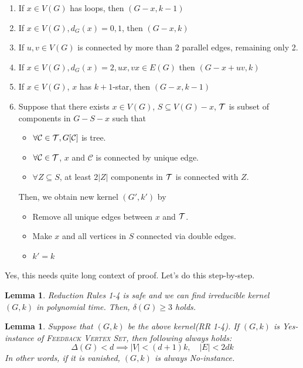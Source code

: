 \documentclass[12pt, a4paper, openany, twoside]{book}
\newtheorem{lem}[thm]{Lemma}
\theoremstyle{definition}
\theoremstyle{remark}
\newcommand{\CC}{{\mathcal {C}}} \newcommand{\CD}{{\mathcal {D}}}
\theoremstyle{plain}
\numberwithin{equation}{section}
\begin{document}
\begin{tcolorbox}[colback=yellow!10!white,colframe=blue!75!white,title=Reduction Rules for FVS kernelization,breakable]

\begin{enumerate}
    \item If $x \in V(G)$ has loops, then $(G - x, k - 1)$
    \item If $x \in V(G), d_G(x) = 0, 1$, then $(G - x, k)$
    \item If $u, v \in V(G)$ is connected by more than 2 parallel edges, remaining only 2.
    \item If $x \in V(G), d_G(x) = 2, ux, vx \in E(G)$ then $(G - x + uv, k)$
    \item If $x \in V(G)$, $x$ has $k+1$-star, then $(G - x, k - 1)$
    \item Suppose that there exists $x \in V(G)$, $S \subseteq V(G) - x$, ${\mathcal {T}}$ is subset of components in $G - S - x$ such that 
    \begin{itemize}
        \item $\forall \CC \in \CT, G[\CC]$ is tree.
        \item $\forall \CC \in \CT$, $x$ and $\CC$ is connected by unique edge. 
        \item $\forall Z \subseteq S$, at least $2|Z|$ components in ${\mathcal {T}}$ is connected with $Z$.
    \end{itemize}
    Then, we obtain new kernel $(G', k')$ by 
    \begin{itemize}
        \item Remove all unique edges between $x$ and ${\mathcal {T}}$. 
        \item Make $x$ and all vertices in $S$ connected via double edges. 
        \item $k' = k$
    \end{itemize}
\end{enumerate}

\end{tcolorbox}

Yes, this needs quite long context of proof. Let's do this step-by-step. 

\begin{lem}
    
Reduction Rules 1-4 is safe and we can find irreducible kernel $(G, k)$ in polynomial time. 
Then, $\delta(G) \geq 3$ holds.

\end{lem}

\begin{lem}
    
Suppose that $(G, k)$ be the above kernel(RR 1-4). If $(G, k)$ is Yes-instance of \textsc{Feedback Vertex Set}, 
then following always holds: 
\[\Delta(G) < d \implies |V| < (d+1)k, \quad |E| < 2dk\]
In other words, if it is vanished, $(G, k)$ is always No-instance.  

\end{lem}
\end{document}
